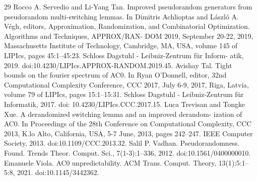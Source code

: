 \begin{thebibliography}{29}
 Rocco A. Servedio and Li-Yang Tan. Improved pseudorandom generators from pseudorandom multi-switching lemmas. In Dimitris Achlioptas and László A. Végh, editors, Approximation, Randomization, and Combinatorial Optimization. Algorithms and Techniques, APPROX/RAN- DOM 2019, September 20-22, 2019, Massachusetts Institute of Technology, Cambridge, MA, USA, volume 145 of LIPIcs, pages 45:1–45:23. Schloss Dagstuhl - Leibniz-Zentrum für Inform- atik, 2019. doi:10.4230/LIPIcs.APPROX-RANDOM.2019.45.
 Avishay Tal. Tight bounds on the fourier spectrum of AC0. In Ryan O’Donnell, editor, 32nd Computational Complexity Conference, CCC 2017, July 6-9, 2017, Riga, Latvia, volume 79 of LIPIcs, pages 15:1–15:31. Schloss Dagstuhl - Leibniz-Zentrum für Informatik, 2017. doi: 10.4230/LIPIcs.CCC.2017.15.
 Luca Trevisan and Tongke Xue. A derandomized switching lemma and an improved derandom- ization of AC0. In Proceedings of the 28th Conference on Computational Complexity, CCC 2013, K.lo Alto, California, USA, 5-7 June, 2013, pages 242–247. IEEE Computer Society, 2013. doi:10.1109/CCC.2013.32.
 Salil P. Vadhan. Pseudorandomness. Found. Trends Theor. Comput. Sci., 7(1-3):1–336, 2012. doi:10.1561/0400000010.
 Emanuele Viola. AC0 unpredictability. ACM Trans. Comput. Theory, 13(1):5:1–5:8, 2021. doi:10.1145/3442362.
\end{thebibliography}
